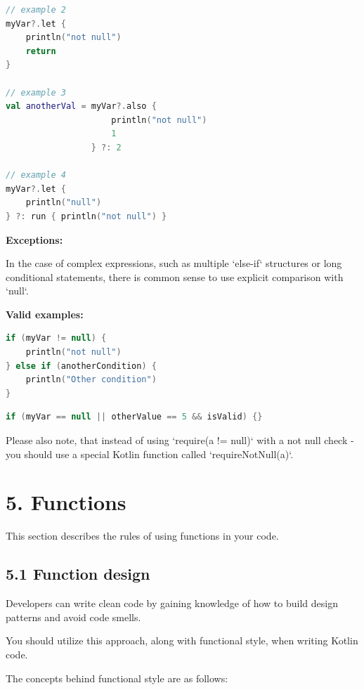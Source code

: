 {{{{\begin{lstlisting}[language=Kotlin]
// example 2
myVar?.let {
    println("not null")
    return
}

// example 3
val anotherVal = myVar?.also {
                     println("not null")
                     1
                 } ?: 2

// example 4
myVar?.let {
    println("null")
} ?: run { println("not null") }
\end{lstlisting}


\textbf{Exceptions:}



In the case of complex expressions, such as multiple `else-if` structures or long conditional statements, there is common sense to use explicit comparison with `null`.



\textbf{Valid examples:}



\begin{lstlisting}[language=Kotlin]
if (myVar != null) {
    println("not null")
} else if (anotherCondition) {
    println("Other condition")
}
\end{lstlisting}


\begin{lstlisting}[language=Kotlin]
if (myVar == null || otherValue == 5 && isValid) {}
\end{lstlisting}


Please also note, that instead of using `require(a != null)` with a not null check - you should use a special Kotlin function called `requireNotNull(a)`.



\section*{\textbf{5. Functions}}

This section describes the rules of using functions in your code.

\subsection*{\textbf{5.1 Function design}}

Developers can write clean code by gaining knowledge of how to build design patterns and avoid code smells.

You should utilize this approach, along with functional style, when writing Kotlin code. 

The concepts behind functional style are as follows: 

}}}}
